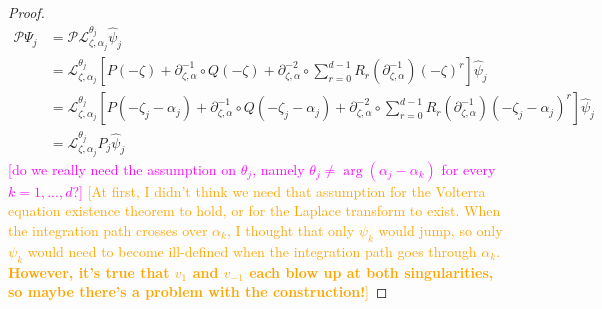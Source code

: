 \documentclass{article}
\theoremstyle{definition}
\newcommand{\fracderiv}[3]{\partial^{#1}_{#2, #3}}
\newcommand{\laplace}{\mathcal{L}}
\begin{document}
\begin{proof}
    \begin{align*}
        \mathcal{P}\Psi_j&=\mathcal{P}\laplace_{\zeta,\alpha_j}^{\theta_j}\hat{\psi}_j\\
        &=\laplace_{\zeta,\alpha_j}^{\theta_j}\left[P(-\zeta)+\fracderiv{-1}{\zeta}{\alpha}\circ Q(-\zeta)+\fracderiv{-2}{\zeta}{\alpha}\circ\sum_{r=0}^{d-1}R_r(\fracderiv{-1}{\zeta}{\alpha})(-\zeta)^r\right]\hat{\psi}_j\\
        &=\laplace_{\zeta,\alpha_j}^{\theta_j}\left[P(-\zeta_j-\alpha_j)+\fracderiv{-1}{\zeta}{\alpha}\circ Q(-\zeta_j-\alpha_j)+\fracderiv{-2}{\zeta}{\alpha}\circ\sum_{r=0}^{d-1}R_r(\fracderiv{-1}{\zeta}{\alpha})(-\zeta_j-\alpha_j)^r\right]\hat{\psi}_j\\
        &=\laplace_{\zeta,\alpha_j}^{\theta_j}\hat{P}_j\hat{\psi}_j
    \end{align*}
    \textcolor{magenta}{[do we really need the assumption on $\theta_j$, namely $\theta_j\neq\arg(\alpha_j-\alpha_k)$ for every $k=1,...,d$?]} \textcolor{orange}{[At first, I didn't think we need that assumption for the Volterra equation existence theorem to hold, or for the Laplace transform to exist. When the integration path crosses over $\alpha_k$, I thought that only $\psi_k$ would jump, so only $\psi_k$ would need to become ill-defined when the integration path goes through $\alpha_k$. \textbf{However, it's true that $v_1$ and $v_{-1}$ each blow up at both singularities, so maybe there's a problem with the construction!}]}
\end{proof}
\end{document}
